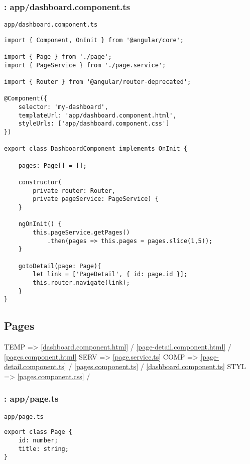 \documentclass[11pt]{article}
\begin{document}
\subsubsection{: app/dashboard.component.ts}
\label{sec-2-4-1}
\begin{verbatim}
app/dashboard.component.ts
\end{verbatim}
\begin{verbatim}
import { Component, OnInit } from '@angular/core';

import { Page } from './page';
import { PageService } from './page.service';

import { Router } from '@angular/router-deprecated';

@Component({
    selector: 'my-dashboard',
    templateUrl: 'app/dashboard.component.html',
    styleUrls: ['app/dashboard.component.css']
})

export class DashboardComponent implements OnInit {

    pages: Page[] = [];

    constructor(
        private router: Router,
        private pageService: PageService) {
    }

    ngOnInit() {
        this.pageService.getPages()
            .then(pages => this.pages = pages.slice(1,5));
    }

    gotoDetail(page: Page){
        let link = ['PageDetail', { id: page.id }];
        this.router.navigate(link);
    }
}
\end{verbatim}

\subsection{Pages}
\label{sec-2-5}

TEMP => \ref{dashboard.component.html} / \ref{page-detail.component.html} / \ref{pages.component.html}
SERV => \ref{page.service.ts} 
COMP => \ref{page-detail.component.ts} / \ref{pages.component.ts} / \ref{dashboard.component.ts}
STYL => \ref{pages.component.css} /

\subsubsection{: app/page.ts}
\label{sec-2-5-1}
\begin{verbatim}
app/page.ts
\end{verbatim}
\begin{verbatim}
export class Page {
    id: number;
    title: string;
}
\end{verbatim}
\end{document}
